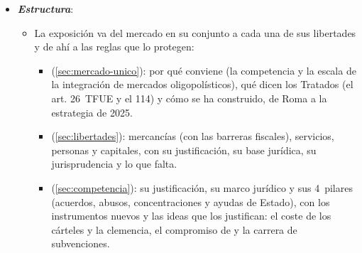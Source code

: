 \documentclass[11pt]{article}
\begin{document}
\begin{itemize}
\item \textbf{\emph{Estructura}}:
  \begin{itemize}
  \item La exposición va del mercado en su conjunto a cada una de sus libertades y de ahí a las reglas que lo protegen:
    \begin{itemize}
    \item {} (\ref{sec:mercado-unico}): por qué conviene (la competencia y la escala de la integración de mercados oligopolísticos), qué dicen los Tratados (el art. 26~TFUE y el 114) y cómo se ha construido, de Roma a la estrategia de 2025.
    \item {} (\ref{sec:libertades}): mercancías (con las barreras fiscales), servicios, personas y capitales, con su justificación, su base jurídica, su jurisprudencia y lo que falta.
    \item {} (\ref{sec:competencia}): su justificación, su marco jurídico y sus 4~pilares (acuerdos, abusos, concentraciones y ayudas de Estado), con los instrumentos nuevos y las ideas que los justifican: el coste de los cárteles y la clemencia, el compromiso de  y la carrera de subvenciones.
    \end{itemize}
  \end{itemize}
\end{itemize}
\end{document}
